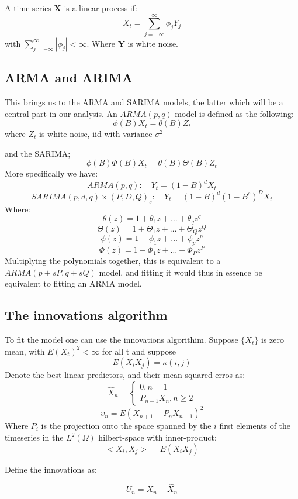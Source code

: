 \documentclass[]{article}
\begin{document}
A time series \(\mathbf{X}\) is a linear process if:
\[X_t = \sum_{j=-\infty}^{\infty}\phi _jY_j\] with
\(\sum_{j=-\infty}^{\infty}|\phi _j|<\infty\). Where \(\mathbf{Y}\) is
white noise.

\hypertarget{arma-and-arima}{%
\subsection{ARMA and ARIMA}\label{arma-and-arima}}

This brings us to the ARMA and SARIMA models, the latter which will be a
central part in our analysis. An \(ARMA(p,q)\) model is defined as the
following: \[\phi(B)X_t = \theta(B)Z_t \] where \(Z_t\) is white noise,
iid with variance \(\sigma^2\)

and the SARIMA; \[\phi(B)\Phi(B)X_t = \theta(B)\Theta(B)Z_ t\] More
specifically we have: \[ARMA(p,q):\quad Y_t=(1-B)^dX_t\]
\[SARIMA(p,d,q)\times(P,D,Q)_s:\quad Y_t=(1-B)^d(1-B^s)^DX_t\] Where:
\[\theta(z)=1+\theta_1z+\dots+\theta_ qz^q\]
\[\Theta(z)=1+\Theta_1z+\dots+\Theta_ Qz^Q\]
\[\phi(z)=1-\phi_1z+\dots+\phi_ pz^p\]
\[\Phi(z)=1-\Phi_1z+\dots+\Phi_Pz^P\] Multiplying the polynomials
together, this is equivalent to a \(ARMA(p+sP,q+sQ)\) model, and fitting
it would thus in essence be equivalent to fitting an ARMA model.

\hypertarget{the-innovations-algorithm}{%
\subsection{The innovations algorithm}\label{the-innovations-algorithm}}

To fit the model one can use the innovations algorithim. Suppose
\(\{ X_t\}\) is zero mean, with \(E(X_t)^2<\infty\) for all t and
suppose \[E(X_iX_j)=\kappa(i,j)\] Denote the best linear predictors, and
their mean squared erros as: \[\hat X_n =\left\{
                \begin{array}{ll}
                  0, n=1 \\
                  P_{n-1}X_n, n \geq 2
                \end{array}
              \right.\] \[\upsilon_n = E(X_{n+1}-P_nX_{n+1})^2\] Where
\(P_i\) is the projection onto the space spanned by the \(i\) first
elements of the timeseries in the \(L^2(\Omega)\) hilbert-space with
inner-product: \[<X_i, X_j> = E(X_iX_j)\]

Define the innovations as:

\[U_n=X_n-\hat X_n\]
\end{document}
